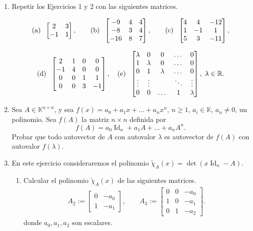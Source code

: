 \documentclass[a4paper,12pt,twoside,spanish,reqno]{amsbook}
\numberwithin{equation}{section}
\begin{document}
\begin{enumerate}[resume,topsep=6pt,itemsep=.4cm]

\item\label{mas} Repetir los Ejercicios 1 y 2 con las siguientes matrices.

$$\textrm{(a)\; }\begin{bmatrix} 2 & 3 \\ -1 & 1
\end{bmatrix}, \qquad
\textrm{(b)\; }\begin{bmatrix} -9 & 4 & 4 \\ -8 & 3 & 4 \\ -16 & 8 & 7 \end{bmatrix}, \qquad \textrm{(c)\; } \left[\begin{matrix}4 & 4 & -12\\ 1 & -1 & 1\\ 5 & 3 & -11 \end{matrix} \right],$$

$$
\textrm{(d)\; } \left[\begin{matrix}2 & 1 & 0 & 0\\ -1 & 4 & 0 & 0\\ 0 & 0 & 1 & 1 \\ 0 & 0 & 3 & -1\end{matrix} \right],
\quad \textrm{(e)\; } \begin{bmatrix} \lambda & 0 & 0 & \dots & 0  \\ 1 & \lambda & 0 &\dots & 0  \\ 0 & 1 & \lambda&  \dots & 0  \\ \vdots & \vdots & \quad & \ddots & \vdots\\ 0 &  0&   \dots & 1  & \lambda \end{bmatrix}, \; \lambda\in \mathbb R.
$$


\item Sea $A\in\mathbb{K}^{n\times n}$, y sea $f(x) = a_0 + a_1 x + \dots + a_nx^n$, $n \geq 1$, $a_i\in\mathbb{K}$, $a_n \neq 0$, un polinomio. Sea $f(A)$ la matriz $n \times n$ definida por
$$f(A) = a_0 \operatorname{Id}_n + a_1 A + \dots + a_n A^n.$$
Probar que todo autovector de $A$ con autovalor $\lambda$ es autovector de $f(A)$ con autovalor $f(\lambda)$.


\item\label{caracteristico-otro} {En este ejercicio consideraremos el polinomio $\tilde\chi_A(x)=\det(x\operatorname{Id}_n-A)$.}

\begin{enumerate}
\item  Calcular el polinomio $\tilde\chi_A(x)$ de las siguientes matrices.
\begin{align*}
A_2 := \begin{bmatrix} 0 & -a_0 \\ 1 & -a_1
\end{bmatrix},\quad\quad
A_3 := \begin{bmatrix} 0 & 0 & -a_0 \\ 1 & 0 & -a_1 \\ 0 & 1 & -a_2
\end{bmatrix}.
\end{align*}
donde $a_0, a_1, a_2$ son escalares.


\end{enumerate}
\end{enumerate}
\end{document}
